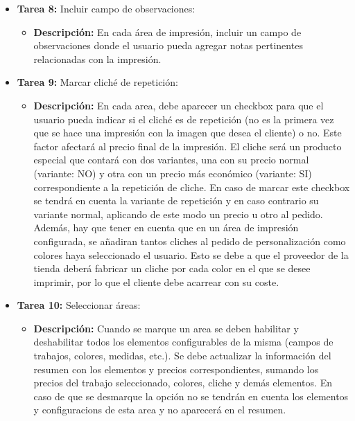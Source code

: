 \documentclass[12pt]{article}
\begin{document}
\begin{itemize}
\begin{itemize}[label=--]
          \end{itemize}
    \item \textbf{Tarea 8:} Incluir campo de observaciones:
          \begin{itemize}[label=--]
              \item \textbf{Descripción:} En cada área de impresión, incluir un campo de observaciones donde el usuario pueda agregar notas pertinentes relacionadas con la impresión.
          \end{itemize}
    
    \item \textbf{Tarea 9:} Marcar cliché de repetición:
          \begin{itemize}[label=--]
              \item \textbf{Descripción:} En cada area, debe aparecer un checkbox para que el usuario pueda indicar si el cliché es de repetición (no es la primera vez que se hace una impresión con la imagen que desea el cliente) o no. Este factor afectará al precio final de la impresión. El cliche será un producto especial que contará con dos variantes, una con su precio normal (variante: NO) y otra con un precio más económico (variante: SI) correspondiente a la repetición de cliche. En caso de marcar este checkbox se tendrá en cuenta la variante de repetición y en caso contrario su variante normal, aplicando de este modo un precio u otro al pedido. Además, hay que tener en cuenta que en un área de impresión configurada, se añadiran tantos cliches al pedido de personalización como colores haya seleccionado el usuario. Esto se debe a que el proveedor de la tienda deberá fabricar un cliche por cada color en el que se desee imprimir, por lo que el cliente debe acarrear con su coste.
          \end{itemize}
    \item \textbf{Tarea 10:} Seleccionar áreas:
          \begin{itemize}[label=--]
              \item \textbf{Descripción:} Cuando se marque un area se deben habilitar y deshabilitar todos los elementos configurables de la misma (campos de trabajos, colores, medidas, etc.). Se debe actualizar la información del resumen con los elementos y precios correspondientes, sumando los precios del trabajo seleccionado, colores, cliche y demás elementos. En caso de que se desmarque la opción no se tendrán en cuenta los elementos y configuracions de esta area y no aparecerá en el resumen.
          \end{itemize}

\end{itemize}
\end{document}
